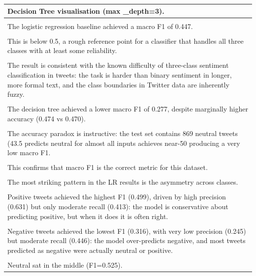 \documentclass[11pt,a4paper,landscape]{article}
\begin{document}
\begin{longtable}{|p{\dimexpr\linewidth-2\tabcolsep-2\arrayrulewidth\relax}|}
\hline
Decision Tree visualisation (max \_depth=3). \\[2pt]
\hline
\rule{0pt}{3.5cm} \\
\hline
The logistic regression baseline achieved a macro F1 of 0.447. \\[2pt]
\hline
\rule{0pt}{3.5cm} \\
\hline
This is below 0.5, a rough reference point for a classifier that handles all three classes with at least some reliability. \\[2pt]
\hline
\rule{0pt}{3.5cm} \\
\hline
The result is consistent with the known difficulty of three-class sentiment classification in tweets: the task is harder than binary sentiment in longer, more formal text, and the class boundaries in Twitter data are inherently fuzzy. \\[2pt]
\hline
\rule{0pt}{3.5cm} \\
\hline
The decision tree achieved a lower macro F1 of 0.277, despite marginally higher accuracy (0.474 vs 0.470). \\[2pt]
\hline
\rule{0pt}{3.5cm} \\
\hline
The accuracy paradox is instructive: the test set contains 869 neutral tweets (43.5 predicts neutral for almost all inputs achieves near-50 producing a very low macro F1. \\[2pt]
\hline
\rule{0pt}{3.5cm} \\
\hline
This confirms that macro F1 is the correct metric for this dataset. \\[2pt]
\hline
\rule{0pt}{3.5cm} \\
\hline
The most striking pattern in the LR results is the asymmetry across classes. \\[2pt]
\hline
\rule{0pt}{3.5cm} \\
\hline
Positive tweets achieved the highest F1 (0.499), driven by high precision (0.631) but only moderate recall (0.413): the model is conservative about predicting positive, but when it does it is often right. \\[2pt]
\hline
\rule{0pt}{3.5cm} \\
\hline
Negative tweets achieved the lowest F1 (0.316), with very low precision (0.245) but moderate recall (0.446): the model over-predicts negative, and most tweets predicted as negative were actually neutral or positive. \\[2pt]
\hline
\rule{0pt}{3.5cm} \\
\hline
Neutral sat in the middle (F1=0.525). \\[2pt]

\end{longtable}
\end{document}
